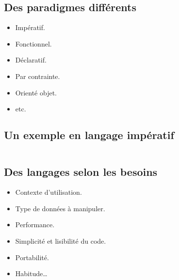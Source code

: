 \subsection{Des paradigmes différents}
\begin{frame}
	\begin{itemize}
		\item Impératif.
		\item Fonctionnel.
		\item Déclaratif.
		\item Par contrainte.
		\item Orienté objet.
		\item etc.
	\end{itemize}
\end{frame}

\subsection{Un exemple en langage impératif}
\begin{frame}
	\begin{example}{}
		\inputminted{python}{example-manipulation/python.py}
	\end{example}
\end{frame}

\subsection{Des langages selon les besoins}
\begin{frame}
	\begin{itemize}
		\item Contexte d'utilisation.
		\item Type de données à manipuler.
		\item Performance.
		\item Simplicité et lisibilité du code.
		\item Portabilité.
		\item Habitude… 
	\end{itemize}
\end{frame}

